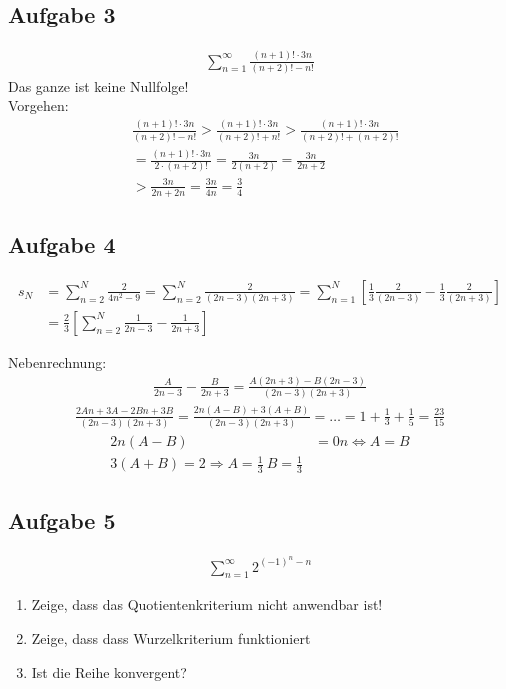 \subsection{Aufgabe 3}
\begin{align*}
    \sum_{n = 1}^{\infty} \frac{(n +1)! \cdot 3n}{(n+2)! - n!}
\end{align*}
Das ganze ist keine Nullfolge!\\
Vorgehen:
\begin{align*}
    &\frac{(n+1)! \cdot 3n}{(n+2)! - n!} > \frac{(n+1)! \cdot 3n}{(n+2)! + n!} > \frac{ (n +1)! \cdot 3n}{(n+2)! + (n+2)!}\\
    &= \frac{(n+1)! \cdot 3n}{2 \cdot (n+2)!} = \frac{3n}{2(n+2)} = \frac{3n}{2n+2}\\
    &> \frac{3n}{2n+2n} = \frac{3n}{4n} = \frac{3}{4}
\end{align*}

\subsection{Aufgabe 4}
\begin{align*}
    s_N &= \sum_{n=2}^{N} \frac{2}{4n^2 - 9} = \sum_{n=2}^{N} \frac{2}{(2n - 3) (2n + 3)} = \sum_{n=1}^{N} \left[ \frac{1}{3} \frac{2}{(2n-3)} - \frac{1}{3} \frac{2}{(2n +3)} \right]\\
    &= \frac{2}{3} \left[\sum_{n = 2}^{N} \frac{1}{2n - 3} - \frac{1}{2n +3} \right]
\end{align*}

Nebenrechnung:
\begin{align*}
    \frac{A}{2n -3} - \frac{B}{2n+3} = \frac{ A(2n +3) - B(2n -3)}{(2n - 3) (2n +3)}
\end{align*}
\begin{align*}
    \frac{2An + 3A - 2Bn + 3B}{(2n - 3) (2n +3)} = \frac{2n(A- B) + 3(A + B)}{(2n - 3) (2n +3)} = \dots = 1 + \frac{1}{3} + \frac{1}{5} = \frac{23}{15}
\end{align*}
\begin{align*}
    2n(A - B) &= 0n \Leftrightarrow A = B\\
    3(A + B) = 2 \Rightarrow A = \frac{1}{3} \ B= \frac{1}{3}
\end{align*}

\subsection{Aufgabe 5}
\begin{align*}
    \sum_{n=1}^{\infty} 2^{(-1)^n - n}
\end{align*}
\begin{enumerate}[label=\alph*)]
    \item Zeige, dass das Quotientenkriterium nicht anwendbar ist!
    \item Zeige, dass dass Wurzelkriterium funktioniert
    \item Ist die Reihe konvergent?
\end{enumerate}